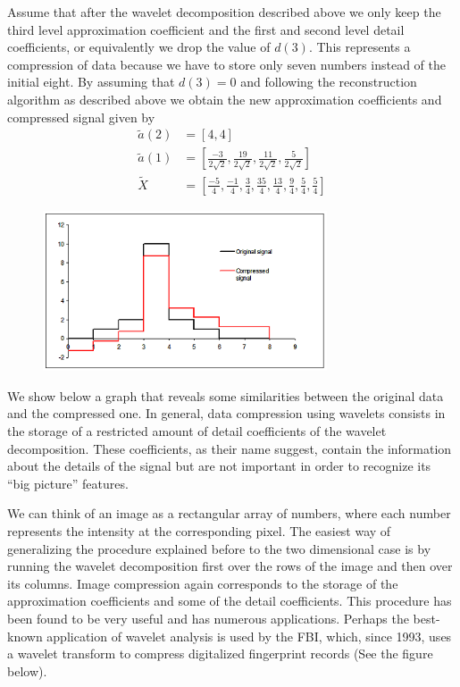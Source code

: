 Assume that after the wavelet decomposition described above we only keep the third level approximation coefficient and the first and second level detail coefficients, or equivalently we drop the value of $d(3)$. This represents a compression of data because we have to store only seven numbers instead of the initial eight. By assuming that $d(3)= 0$ and following the reconstruction algorithm as described above we obtain the new approximation coefficients and compressed signal given by
	\[
	\begin{split}
	\tilde{a}(2)&= [4, 4] \\
	\tilde{a}(1)&= \left[ \frac{-3}{2\sqrt{2}}, \frac{19}{2\sqrt{2}}, \frac{11}{2\sqrt{2}}, \frac{5}{2\sqrt{2}} \right] \\
	\tilde{X}&= \left[ \frac{-5}{4}, \frac{-1}{4}, \frac{3}{4}, \frac{35}{4}, \frac{13}{4}, \frac{9}{4}, \frac{5}{4},\frac{5}{4} \right]
	\end{split}
	\]

	\begin{figure}[H]
	\centering
	\includegraphics[width=0.75\textwidth]{../sections/seasons/season1/107/images/original_signal_3.png} 
	\end{figure}

We show below a graph that reveals some similarities between the original data and the compressed one. In general, data compression using wavelets consists in the storage of a restricted amount of detail coefficients of the wavelet decomposition. These coefficients, as their name suggest, contain the information about the details of the signal but are not important in order to recognize its ``big picture'' features.




We can think of an image as a rectangular array of numbers, where each number represents the intensity at the corresponding pixel. The easiest way of generalizing the procedure explained before to the two dimensional case is by running the wavelet decomposition first over the rows of the image and then over its columns. Image compression again corresponds to the storage of the approximation coefficients and some of the detail coefficients. This procedure has been found to be very useful and has numerous applications. Perhaps the best-known application of wavelet analysis is used by the FBI, which, since 1993, uses a wavelet transform to compress digitalized fingerprint records (See the figure below).

